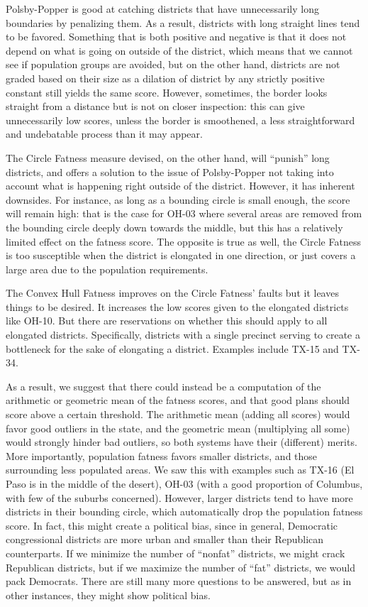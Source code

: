 \documentclass[letterpaper]{article}
\begin{document}
Polsby-Popper is good at catching districts that have unnecessarily long boundaries by penalizing them. As a result, districts with long straight lines tend to be favored. Something that is both positive and negative is that it does not depend on what is going on outside of the district, which means that we cannot see if population groups are avoided, but on the other hand, districts are not graded based on their size as a dilation of district by any strictly positive constant still yields the same score. However, sometimes, the border looks straight from a distance but is not on closer inspection: this can give unnecessarily low scores, unless the border is smoothened, a less straightforward and undebatable process than it may appear.

The Circle Fatness measure devised, on the other hand, will “punish” long districts, and offers a solution to the issue of Polsby-Popper not taking into account what is happening right outside of the district. However, it has inherent downsides. For instance, as long as a bounding circle is small enough, the score will remain high: that is the case for OH-03 where several areas are removed from the bounding circle deeply down towards the middle, but this has a relatively limited effect on the fatness score. The opposite is true as well, the Circle Fatness is too susceptible when the district is elongated in one direction, or just covers a large area due to the population requirements.

The Convex Hull Fatness improves on the Circle Fatness' faults but it leaves things to be desired. It increases the low scores given to the elongated districts like OH-10. But there are reservations on whether this should apply to all elongated districts. Specifically, districts with a single precinct serving to create a bottleneck for the sake of elongating a district. Examples include TX-15 and TX-34.

As a result, we suggest that there could instead be a computation of the arithmetic or geometric mean of the fatness scores, and that good plans should score above a certain threshold. The arithmetic mean (adding all scores) would favor good outliers in the state, and the geometric mean (multiplying all some) would strongly hinder bad outliers, so both systems have their (different) merits. More importantly, population fatness favors smaller districts, and those surrounding less populated areas. We saw this with examples such as TX-16 (El Paso is in the middle of the desert), OH-03 (with a good proportion of Columbus, with few of the suburbs concerned). However, larger districts tend to have more districts in their bounding circle, which automatically drop the population fatness score. In fact, this might create a political bias, since in general, Democratic congressional districts are more urban and smaller than their Republican counterparts. If we minimize the number of “nonfat” districts, we might crack Republican districts, but if we maximize the number of “fat” districts, we would pack Democrats. There are still many more questions to be answered, but as in other instances, they might show political bias. 


\printbibliography
\end{document}
